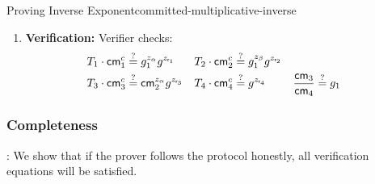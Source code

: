 \begin{protocol}{Proving Inverse Exponent}{committed-multiplicative-inverse}
\begin{enumerate}
    \item \textbf{Verification:} Verifier checks:
    \begin{align*}
         T_1 \cdot \mathsf{cm}_1^c &\stackrel{?}{=}  g_1^{z_\alpha} g^{z_{\mathsf{r}_1}}
        & 
         T_2 \cdot \mathsf{cm}_2^c &\stackrel{?}{=}  g_1^{z_\beta} g^{z_{\mathsf{r}_2}}
         \\
        T_3 \cdot \mathsf{cm}_3^c &\stackrel{?}{=} \mathsf{cm}_2^{z_\alpha} g^{z_{\mathsf{r}_3}}
        &
        T_4 \cdot \mathsf{cm}_4^c &\stackrel{?}{=}  g^{z_{\mathsf{r}_4}} 
        &
        \frac{\mathsf{cm}_3}{\mathsf{cm}_4} &\stackrel{?}{=} g_1
    \end{align*}
\end{enumerate}
\end{protocol}

\subsubsection*{Completeness}:
We show that if the prover follows the protocol honestly, all verification equations will be satisfied.

